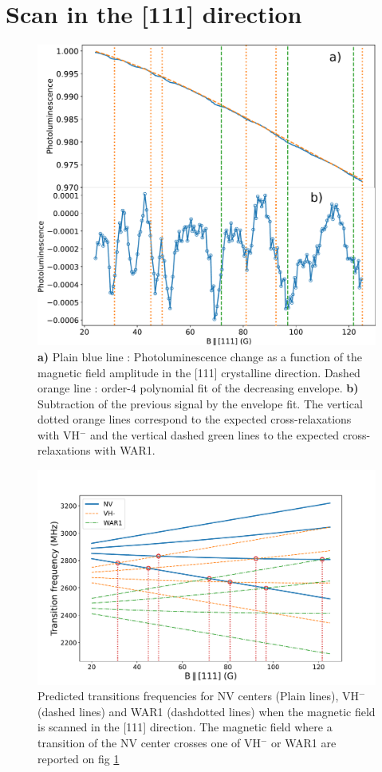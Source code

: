 \documentclass{article}
\begin{document}
\section{Scan in the [111] direction}
\begin{figure}
\label{scan_PL}
\includegraphics[scale=.48]{scan_111_PL}
\caption{\textbf{a)} Plain blue line : Photoluminescence change as a function of the magnetic field amplitude in the [111] crystalline direction. Dashed orange line : order-4 polynomial fit of the decreasing envelope. \textbf{b)} Subtraction of the previous signal by the envelope fit. The vertical dotted orange lines correspond to the expected cross-relaxations with VH$^-$ and the vertical dashed green lines to the expected cross-relaxations with WAR1.}
\end{figure}
\begin{figure}
\label{transis_VHWAR}
\includegraphics[scale=.48]{Transis_111_VHWAR}
\caption{Predicted transitions frequencies for NV centers (Plain lines), VH$^-$ (dashed lines) and WAR1 (dashdotted lines) when the magnetic field is scanned in the [111] direction. The magnetic field where a transition of the NV center crosses one of VH$^-$ or WAR1 are reported on fig \ref{scan_PL}}
\end{figure}
\end{document}
